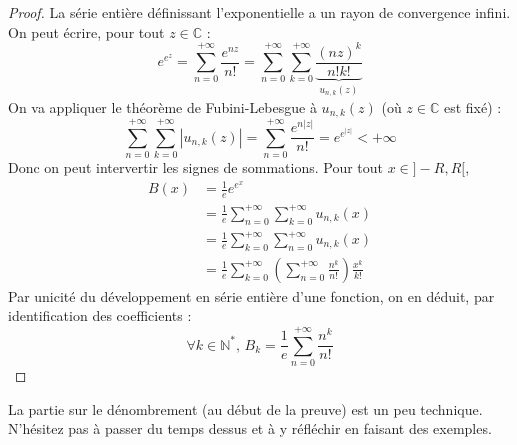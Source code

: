\begin{proof}
    \newpar
    La série entière définissant l'exponentielle a un rayon de convergence infini. On peut écrire, pour tout $z \in \mathbb{C}$ :
    \[ e^{e^z} = \sum_{n=0}^{+\infty} \frac{e^{nz}}{n!} = \sum_{n=0}^{+\infty} \sum_{k=0}^{+\infty} \underbrace{\frac{(nz)^k}{n!k!}}_{u_{n,k}(z)} \]
    On va appliquer le théorème de Fubini-Lebesgue à $u_{n,k}(z)$ (où $z \in \mathbb{C}$ est fixé) :
    \[ \sum_{n=0}^{+\infty} \sum_{k=0}^{+\infty} |u_{n,k}(z)| = \sum_{n=0}^{+\infty} \frac{e^{n|z|}}{n!} = e^{e^{|z|}} < +\infty \]
    Donc on peut intervertir les signes de sommations. Pour tout $x \in ]-R,R[$,
    \begin{align*}
      B(x) &= \frac{1}{e} e^{e^x} \\
      &= \frac{1}{e} \sum_{n=0}^{+\infty} \sum_{k=0}^{+\infty} u_{n,k}(x) \\
      &= \frac{1}{e} \sum_{k=0}^{+\infty} \sum_{n=0}^{+\infty} u_{n,k}(x) \\
      &= \frac{1}{e} \sum_{k=0}^{+\infty} \left( \sum_{n=0}^{+\infty} \frac{n^k}{n!} \right) \frac{x^k}{k!}
    \end{align*}
    Par unicité du développement en série entière d'une fonction, on en déduit, par identification des coefficients :
    \[ \forall k \in \mathbb{N}^*, \, B_k = \frac{1}{e} \sum_{n=0}^{+\infty} \frac{n^k}{n!} \]
  \end{proof}

  La partie sur le dénombrement (au début de la preuve) est un peu technique. N'hésitez pas à passer du temps dessus et à y réfléchir en faisant des exemples.

